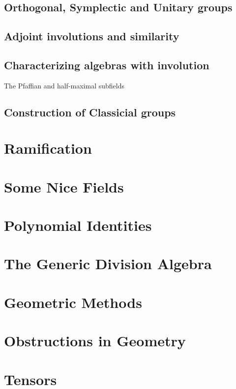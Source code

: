 \documentclass[12pt]{report}
\theoremstyle{plain}
\newcommand{\todo}[1]{\textcolor{todo}{#1}}
\begin{document}
\section{Orthogonal, Symplectic and Unitary groups}

\section{Adjoint involutions and similarity}

\section{Characterizing algebras with involution}

\todo{The Pfaffian and half-maximal subfields}

\section{Construction of Classicial groups}

\chapter{Ramification}

\chapter{Some Nice Fields}

\chapter{Polynomial Identities}

\chapter{The Generic Division Algebra}

\chapter{Geometric Methods}

\chapter{Obstructions in Geometry}

\fi

\appendix

\chapter{Tensors}
\end{document}

